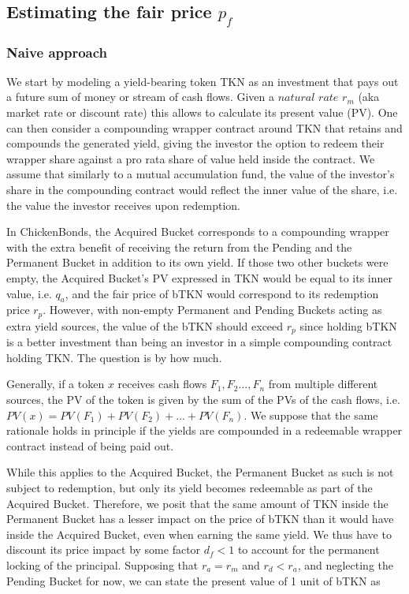 \documentclass{article}
\begin{document}
\subsection{Estimating the fair price $p_f$}
\subsubsection{Naive approach}
We start by modeling a yield-bearing token TKN as an investment that pays out a future sum of money or stream of cash flows. Given a $\textit{natural rate}$ $r_m$ (aka market rate or discount rate) this allows to calculate its present value (PV). One can then consider a compounding wrapper contract around TKN that retains and compounds the generated yield, giving the investor the option to redeem their wrapper share against a pro rata share of value held inside the contract. We assume that similarly to a mutual accumulation fund, the value of the investor's share in the compounding contract would reflect the inner value of the share, i.e. the value the investor receives upon redemption. 

In ChickenBonds, the Acquired Bucket corresponds to a compounding wrapper with the extra benefit of receiving the return from the Pending and the Permanent Bucket in addition to its own yield. If those two other buckets were empty, the Acquired Bucket's PV expressed in TKN would be equal to its inner value, i.e. $q_a$, and the fair price of bTKN would correspond to its redemption price $r_p$. However, with non-empty Permanent and Pending Buckets acting as extra yield sources, the value of the bTKN should exceed $r_p$ since holding bTKN is a better investment than being an investor in a simple compounding contract holding TKN. The question is by how much. 

Generally, if a token $x$ receives cash flows $F_1, F_2..., F_n$ from multiple different sources, the PV of the token is given by the sum of the PVs of the cash flows, i.e. $PV(x) = PV(F_1) + PV(F_2) + ... + PV(F_n)$. We suppose that the same rationale holds in principle if the yields are compounded in a redeemable wrapper contract instead of being paid out. 

While this applies to the Acquired Bucket, the Permanent Bucket as such is not subject to redemption, but only its yield becomes redeemable as part of the Acquired Bucket. Therefore, we posit that the same amount of TKN inside the Permanent Bucket has a lesser impact on the price of bTKN than it would have inside the Acquired Bucket, even when earning the same yield. We thus have to discount its price impact by some factor $d_f < 1$ to account for the permanent locking of the principal. Supposing that $r_a = r_m$ and $r_d < r_a$, and neglecting the Pending Bucket for now, we can state the present value of 1 unit of bTKN as
\end{document}
